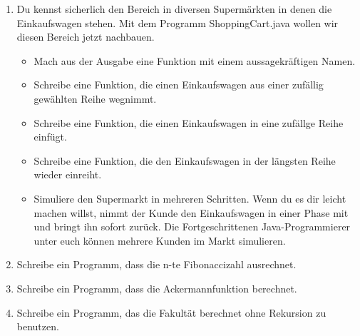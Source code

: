 \begin{enumerate}
	\item Du kennst sicherlich den Bereich in diversen Supermärkten in denen die Einkaufswagen stehen. Mit dem Programm ShoppingCart.java wollen wir diesen Bereich jetzt nachbauen.
	\begin{itemize}
		\item Mach aus der Ausgabe eine Funktion mit einem aussagekräftigen Namen.
		\item Schreibe eine Funktion, die einen Einkaufswagen aus einer zufällig gewählten Reihe wegnimmt.
		\item Schreibe eine Funktion, die einen Einkaufswagen in eine zufällge Reihe einfügt.
		\item Schreibe eine Funktion, die den Einkaufswagen in der längsten Reihe wieder einreiht.
		\item Simuliere den Supermarkt in mehreren Schritten. Wenn du es dir leicht machen willst, nimmt der Kunde den Einkaufswagen in einer Phase mit und bringt ihn sofort zurück. Die Fortgeschrittenen Java-Programmierer unter euch können mehrere Kunden im Markt simulieren.
	\end{itemize}
	\item Schreibe ein Programm, dass die n-te Fibonaccizahl ausrechnet.
	\item Schreibe ein Programm, dass die Ackermannfunktion berechnet.
	\item Schreibe ein Programm, das die Fakultät berechnet ohne Rekursion zu benutzen.
\end{enumerate}
